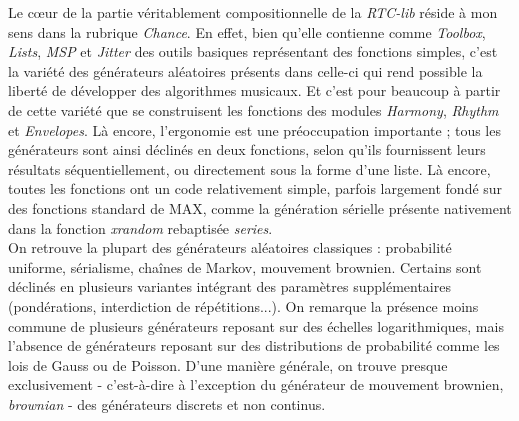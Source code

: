 \documentclass[a4paper,12pt]{article}
\begin{document}
Le cœur de la partie véritablement compositionnelle de la \emph{RTC-lib} réside à mon sens dans la rubrique \emph{Chance}. En effet, bien qu'elle contienne comme \emph{Toolbox}, \emph{Lists}, \emph{MSP} et \emph{Jitter} des outils basiques représentant des fonctions simples, c'est la variété des générateurs aléatoires présents dans celle-ci qui rend possible la liberté de développer des algorithmes musicaux. Et c'est pour beaucoup à partir de cette variété que se construisent les fonctions des modules \emph{Harmony}, \emph{Rhythm} et \emph{Envelopes}. Là encore, l'ergonomie est une préoccupation importante ; tous les générateurs sont ainsi déclinés en deux fonctions, selon qu'ils fournissent leurs résultats séquentiellement, ou directement sous la forme d'une liste. Là encore, toutes les fonctions ont un code relativement simple, parfois largement fondé sur des fonctions standard de MAX, comme la génération sérielle présente nativement dans la fonction \emph{xrandom} rebaptisée \emph{series}. \\
On retrouve la plupart des générateurs aléatoires classiques : probabilité uniforme, sérialisme, chaînes de Markov, mouvement brownien. Certains sont déclinés en plusieurs variantes intégrant des paramètres supplémentaires (pondérations, interdiction de répétitions...). On remarque la présence moins commune de plusieurs générateurs reposant sur des échelles logarithmiques, mais l'absence de générateurs reposant sur des distributions de probabilité comme les lois de Gauss ou de Poisson. D'une manière générale, on trouve presque exclusivement - c'est-à-dire à l'exception du générateur de mouvement brownien, \emph{brownian} - des générateurs discrets et non continus.
\end{document}
